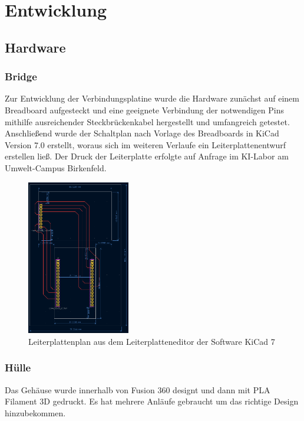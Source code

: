 \documentclass[../main.tex]{subfiles}
\begin{document}
\section{Entwicklung}

\subsection{Hardware}
\subsubsection{Bridge}
Zur Entwicklung der Verbindungsplatine wurde die Hardware zunächst auf einem Breadboard aufgesteckt und eine geeignete Verbindung der notwendigen Pins mithilfe ausreichender Steckbrückenkabel hergestellt und umfangreich getestet. Anschließend wurde der Schaltplan nach Vorlage des Breadboards in KiCad Version 7.0 erstellt, woraus sich im weiteren Verlaufe ein Leiterplattenentwurf erstellen ließ. Der Druck der Leiterplatte erfolgte auf Anfrage im KI-Labor am Umwelt-Campus Birkenfeld.

\begin{figure}[!ht]
    \centering
    \includegraphics[width=0.4\textwidth, angle=-90]{images/leiterplatte.png}
    \caption{Leiterplattenplan aus dem Leiterplatteneditor der Software KiCad 7}
    \label{fig:Bridge}
    \centering
\end{figure}



\subsubsection{Hülle}

Das Gehäuse wurde innerhalb von Fusion 360 designt und dann mit PLA Filament 3D gedruckt. Es hat mehrere Anläufe gebraucht um das richtige Design hinzubekommen.
\end{document}
